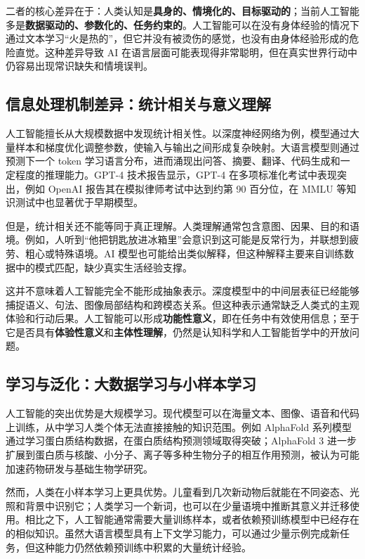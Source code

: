 \documentclass[UTF8,zihao=5,a4paper]{ctexart}
\begin{document}
二者的核心差异在于：人类认知是\textbf{具身的、情境化的、目标驱动的}；当前人工智能多是\textbf{数据驱动的、参数化的、任务约束的}。人工智能可以在没有身体经验的情况下通过文本学习“火是热的”，但它并没有被烫伤的感觉，也没有由身体经验形成的危险直觉。这种差异导致 AI 在语言层面可能表现得非常聪明，但在真实世界行动中仍容易出现常识缺失和情境误判。

\subsection{信息处理机制差异：统计相关与意义理解}

人工智能擅长从大规模数据中发现统计相关性。以深度神经网络为例，模型通过大量样本和梯度优化调整参数，使输入与输出之间形成复杂映射。大语言模型则通过预测下一个 token 学习语言分布，进而涌现出问答、摘要、翻译、代码生成和一定程度的推理能力。GPT-4 技术报告显示，GPT-4 在多项标准化考试中表现突出，例如 OpenAI 报告其在模拟律师考试中达到约第 90 百分位，在 MMLU 等知识测试中也显著优于早期模型\cite{openai2023gpt4}。

但是，统计相关还不能等同于真正理解。人类理解通常包含意图、因果、目的和语境。例如，人听到“他把钥匙放进冰箱里”会意识到这可能是反常行为，并联想到疲劳、粗心或特殊语境。AI 模型也可能给出类似解释，但这种解释主要来自训练数据中的模式匹配，缺少真实生活经验支撑。

这并不意味着人工智能完全不能形成抽象表示。深度模型中的中间层表征已经能够捕捉语义、句法、图像局部结构和跨模态关系。但这种表示通常缺乏人类式的主观体验和行动后果。人工智能可以形成\textbf{功能性意义}，即在任务中有效使用信息；至于它是否具有\textbf{体验性意义}和\textbf{主体性理解}，仍然是认知科学和人工智能哲学中的开放问题。

\subsection{学习与泛化：大数据学习与小样本学习}

人工智能的突出优势是大规模学习。现代模型可以在海量文本、图像、语音和代码上训练，从中学习人类个体无法直接接触的知识范围。例如 AlphaFold 系列模型通过学习蛋白质结构数据，在蛋白质结构预测领域取得突破；AlphaFold 3 进一步扩展到蛋白质与核酸、小分子、离子等多种生物分子的相互作用预测，被认为可能加速药物研发与基础生物学研究\cite{alphafold2024nature}。

然而，人类在小样本学习上更具优势。儿童看到几次新动物后就能在不同姿态、光照和背景中识别它；人类学习一个新词，也可以在少量语境中推断其意义并迁移使用。相比之下，人工智能通常需要大量训练样本，或者依赖预训练模型中已经存在的相似知识。虽然大语言模型具有上下文学习能力，可以通过少量示例完成新任务，但这种能力仍然依赖预训练中积累的大量统计经验。
\end{document}
